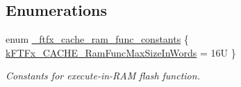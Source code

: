 \subsection*{Enumerations}
\begin{DoxyCompactItemize}
\item 
enum \mbox{\hyperlink{group__ftfx__cache__driver_ga94656a81b8ad03c18f8b74dc1a4150d1}{\+\_\+ftfx\+\_\+cache\+\_\+ram\+\_\+func\+\_\+constants}} \{ \mbox{\hyperlink{group__ftfx__cache__driver_gga94656a81b8ad03c18f8b74dc1a4150d1a780ff9cafbfa8b208994881cbe18c182}{k\+F\+T\+Fx\+\_\+\+C\+A\+C\+H\+E\+\_\+\+Ram\+Func\+Max\+Size\+In\+Words}} = 16U
 \}
\begin{DoxyCompactList}\small\item\em Constants for execute-\/in-\/\+R\+AM flash function. \end{DoxyCompactList}\end{DoxyCompactItemize}
